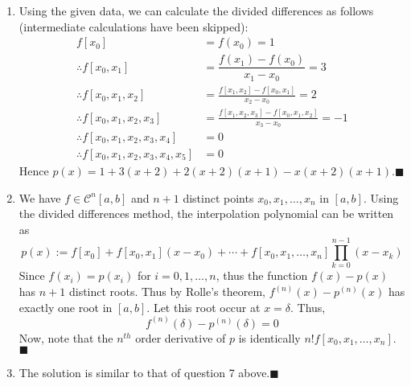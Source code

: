 \documentclass[a4paper, 11pt]{article}
\begin{document}
\begin{enumerate}[label=(\arabic*), leftmargin=*]
	\item Using the given data, we can calculate the divided differences as follows (intermediate calculations have been skipped):
\begin{align*}
	f[x_0] &= f(x_0) = 1\\
	\therefore f[x_0,x_1] &= \dfrac{f(x_1)-f(x_0)}{x_1-x_0} = 3\\
	\therefore f[x_0,x_1,x_2] & = \frac{f[x_1,x_2]-f[x_0,x_1]}{x_2-x_0}=2\\
	\therefore f[x_0,x_1,x_2,x_3] &= \frac{f[x_1,x_2,x_3]-f[x_0,x_1,x_2]}{x_3-x_0}=-1\\
	\therefore f[x_0,x_1,x_2,x_3,x_4] &= 0\\
	\therefore f[x_0,x_1,x_2,x_3,x_4,x_5] &=0
\end{align*}
Hence $p(x)=1+3(x+2)+2(x+2)(x+1)-x(x+2)(x+1)$.\hfill$\blacksquare$

	\item We have $f\in\mathcal{C}^n[a,b]$ and $n+1$ distinct points $x_0,x_1,\dots,x_n$ in $[a,b]$. Using the divided differences method, the interpolation polynomial can be written as $$p(x):= f[x_0]  + f[x_0, x_1](x - x_0)+\cdots+f[x_0,x_1,\dots,x_n]\prod_{k=0}^{n-1}(x-x_k)$$
	Since $f(x_i)=p(x_i)$ for $i=0,1,\dots,n$, thus the function $f(x)-p(x)$ has $n+1$ distinct roots. Thus by Rolle's theorem, $f^{(n)}(x)-p^{(n)}(x)$ has exactly one root in $[a,b]$. Let this root occur at $x=\delta$. Thus,
	$$f^{(n)}(\delta)-p^{(n)}(\delta)=0$$
Now, note that the $n^{th}$ order derivative of $p$ is identically $n!f[x_0,x_1,\dots,x_n]$.\hfill$\blacksquare$

	\item The solution is similar to that of question 7 above.\hfill$\blacksquare$
\end{enumerate}
\end{document}
